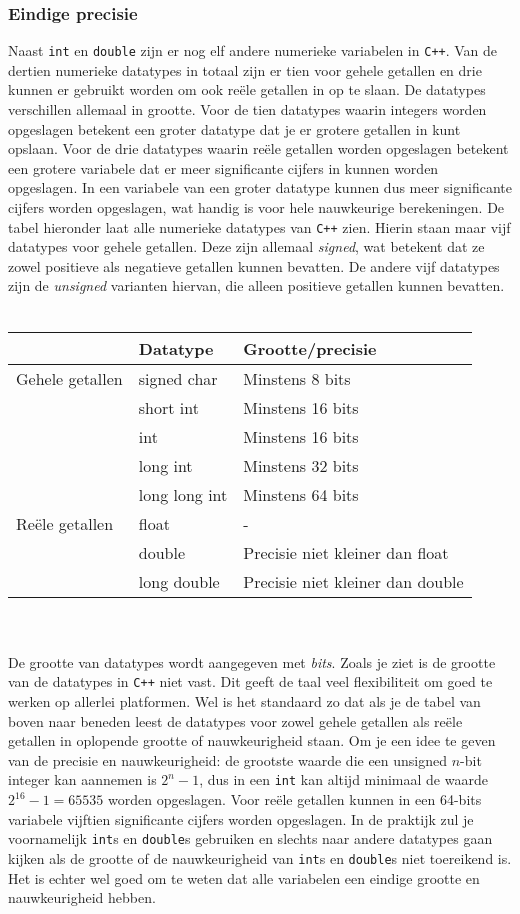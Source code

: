 \documentclass[12pt,a4paper]{article}
\newcommand{\icode}{\lstinline}
\begin{document}
\subsubsection{Eindige precisie}
Naast \icode{int} en \icode{double} zijn er nog elf andere numerieke variabelen in \icode{C++}. Van de dertien numerieke datatypes in totaal zijn er tien voor gehele getallen en drie kunnen er gebruikt worden om ook re\"ele getallen in op te slaan. De datatypes verschillen allemaal in grootte. Voor de tien datatypes waarin integers worden opgeslagen betekent een groter datatype dat je er grotere getallen in kunt opslaan. Voor de drie datatypes waarin re\"ele getallen worden opgeslagen betekent een grotere variabele dat er meer significante cijfers in kunnen worden opgeslagen. In een variabele van een groter datatype kunnen dus meer significante cijfers worden opgeslagen, wat handig is voor hele nauwkeurige berekeningen. De tabel hieronder laat alle numerieke datatypes van \icode{C++} zien. Hierin staan maar vijf datatypes voor gehele getallen. Deze zijn allemaal \emph{signed}, wat betekent dat ze zowel positieve als negatieve getallen kunnen bevatten. De andere vijf datatypes zijn de \emph{unsigned} varianten hiervan, die alleen positieve getallen kunnen bevatten. \\ 
\\ 
\begin{tabular}{l l l}
& \textbf{Datatype} & \textbf{Grootte/precisie} \\ 
\hline 
Gehele getallen & signed char & Minstens 8 bits \\ 
& short int & Minstens 16 bits \\ 
& int & Minstens 16 bits \\ 
& long int & Minstens 32 bits \\ 
& long long int & Minstens 64 bits \\ 
Re\"ele getallen & float & - \\ 
& double & Precisie niet kleiner dan float \\ 
& long double & Precisie niet kleiner dan double \\ 
\end{tabular} \\ 
\\ 
De grootte van datatypes wordt aangegeven met \emph{bits}. Zoals je ziet is de grootte van de datatypes in \icode{C++} niet vast. Dit geeft de taal veel flexibiliteit om goed te werken op allerlei platformen. Wel is het standaard zo dat als je de tabel van boven naar beneden leest de datatypes voor zowel gehele getallen als re\"ele getallen in oplopende grootte of nauwkeurigheid staan. Om je een idee te geven van de precisie en nauwkeurigheid: de grootste waarde die een unsigned $n$-bit integer kan aannemen is $2^n-1$, dus in een \icode{int} kan altijd minimaal de waarde $2^{16} - 1 = 65535$ worden opgeslagen. Voor re\"ele getallen kunnen in een 64-bits variabele vijftien significante cijfers worden opgeslagen. In de praktijk zul je voornamelijk \icode{int}s en \icode{double}s gebruiken en slechts naar andere datatypes gaan kijken als de grootte of de nauwkeurigheid van \icode{int}s en \icode{double}s niet toereikend is. Het is echter wel goed om te weten dat alle variabelen een eindige grootte en nauwkeurigheid hebben. 
\end{document}
